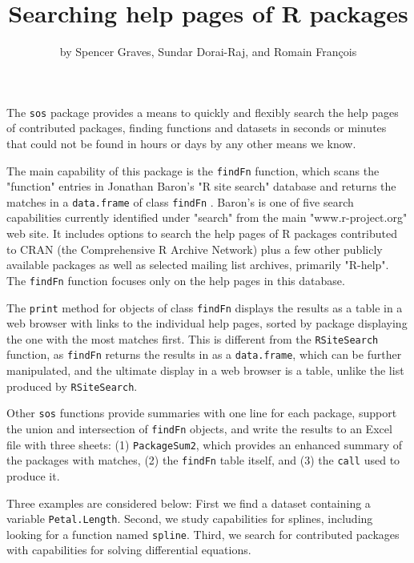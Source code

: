 \title{Searching help pages of R packages}
\author{by Spencer Graves, Sundar Dorai-Raj, and Romain Fran{\c c}ois}

\maketitle

The {\tt sos} package provides a means to quickly and flexibly
search the help pages of contributed packages, finding
functions and datasets in seconds or minutes that could not be
found in hours or days by any other means we know.

The main capability of this package is the {\tt findFn} function, which scans the "function" entries in Jonathan Baron's "R site search"
database and returns the matches in a {\tt data.frame} of class
{\tt findFn} \citep{JB09URL}.  Baron's is one of five
search capabilities currently identified under "search" from the main "www.r-project.org" web site.  It includes options to
search the help pages of R packages contributed to CRAN (the 
Comprehensive R Archive Network) plus a few other publicly 
available packages as well as selected mailing list archives, 
primarily "R-help".  The {\tt findFn} function focuses only 
on the help pages in this database.  

The {\tt print} method for objects of class {\tt findFn}
displays the results as a table in a web
browser with links to the individual help pages, sorted by package
displaying the one with the most matches first.  This is different
from the {\tt RSiteSearch} function, as {\tt findFn} returns
the results in \R{} as a {\tt data.frame}, which can be further
manipulated, and the ultimate display in a web browser is a
table, unlike the list produced by {\tt RSiteSearch}.

Other {\tt sos} functions provide summaries with one line for each
package, support the union and intersection of {\tt findFn} objects,
and write the results to an Excel file with three sheets:  (1)
{\tt PackageSum2}, which provides an enhanced summary of the packages
with matches, (2) the {\tt findFn} table itself, and (3) the {\tt call}
used to produce it.

Three examples are considered below:  First we find a dataset
containing a variable {\tt Petal.Length}. Second, we study
\R{} capabilities for splines, including looking for a function
named {\tt spline}.  Third, we search for contributed \R{} packages
 with capabilities for solving differential equations.

